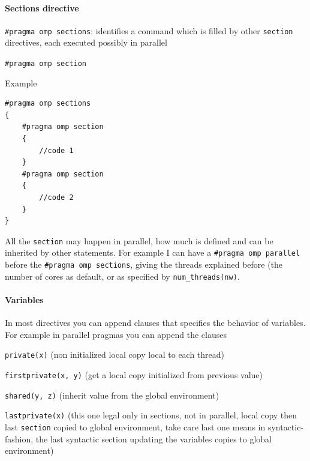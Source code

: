 \documentclass[10pt]{report}
\begin{document}
\paragraph{Sections directive}
\begin{list}{}{}
	\item \texttt{\#pragma omp sections}: identifies a command which is filled by other \texttt{section} directives, each executed possibly in parallel
	\item \texttt{\#pragma omp section}
\end{list}
Example
\begin{lstlisting}[style=myC]
#pragma omp sections
{
	#pragma omp section
	{
		//code 1
	}
	#pragma omp section
	{
		//code 2
	}
}
\end{lstlisting}
All the \texttt{section} may happen in parallel, how much is defined and can be inherited by other statements. For example I can have a \texttt{\#pragma omp parallel} before the \texttt{\#pragma omp sections}, giving the threads explained before (the number of cores as default, or as specified by \texttt{num\_threads(nw)}.
\paragraph{Variables} In most directives you can append clauses that specifies the behavior of variables.\\
For example in parallel pragmas you can append the clauses\begin{list}{}{}
	\item\texttt{private(x)} (non initialized local copy local to each thread)
	\item\texttt{firstprivate(x, y)} (get a local copy initialized from previous value)
	\item\texttt{shared(y, z)} (inherit value from the global environment)
	\item\texttt{lastprivate(x)} (this one legal only in sections, not in parallel, local copy then last \texttt{section} copied to global environment, take care last one means in syntactic-fashion, the last syntactic section updating the variables copies to global environment)
\end{list}
\end{document}
